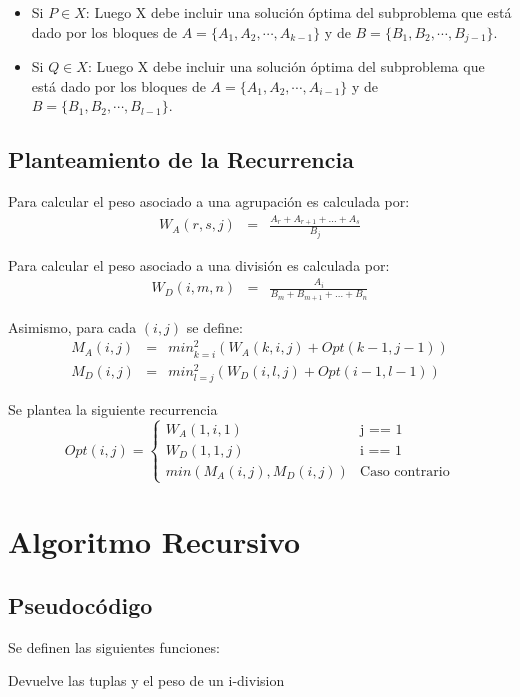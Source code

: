 \documentclass{article}
\begin{document}
\begin{itemize}
\item Si $ P \in X $:  Luego X debe incluir una solución óptima del subproblema que está dado por los bloques de $A = \{ A_1, A_2,\cdots,A_{k-1} \}$ y de $B = \{B_1,B_2,\cdots,B_{j-1}\}$.
\item Si $ Q \in X $:  Luego X debe incluir una solución óptima del subproblema que está dado por los bloques de $A = \{ A_1, A_2,\cdots,A_{i-1} \}$ y de $B = \{B_1,B_2,\cdots,B_{l-1} \}$.
\end{itemize}

\subsection{Planteamiento de la Recurrencia}
Para calcular el peso asociado a una agrupación es calculada por:
\begin{eqnarray*}
W_A(r,s,j) & = & \frac{A_r+A_{r+1}+\dots+A_s}{B_j}
\end{eqnarray*}

Para calcular el peso asociado a una división es calculada por:
\begin{eqnarray*}
W_D(i,m,n) & = & \frac{A_i}{B_m+B_{m+1}+\dots+B_n}
\end{eqnarray*}

Asimismo, para cada $(i,j)$ se define:
\begin{eqnarray*}
M_A(i,j) & = & min_{k=i}^{2}\left( W_A(k,i,j) + Opt(k-1,j-1) \right) \\ 
M_D(i,j) & = & min_{l=j}^{2}\left( W_D(i,l,j) + Opt(i-1,l-1) \right)
\end{eqnarray*}

Se plantea la siguiente recurrencia
\begin{equation*}
Opt(i,j) =
\begin{cases}
W_A(1,i,1) & \text{j == 1}\\
W_D(1,1,j) & \text{i == 1}\\
min( M_A(i,j) , M_D(i,j) ) &  \text{Caso contrario}
\end{cases}
\end{equation*}

\section{Algoritmo Recursivo}
\subsection{Pseudocódigo}
Se definen las siguientes funciones:
\begin{algorithm}
\caption{Devuelve las tuplas y el peso de un i-division}
\begin{algorithmic}[1]
    \EndFor
\EndProcedure
\end{algorithmic}
\end{algorithm}
\end{document}
